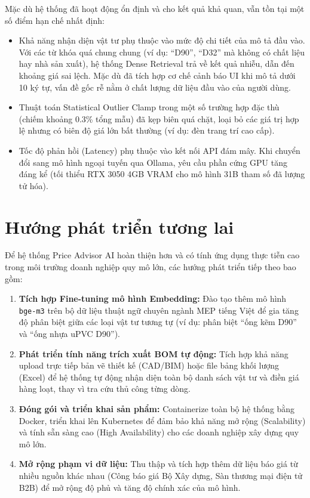Mặc dù hệ thống đã hoạt động ổn định và cho kết quả khả quan, vẫn tồn tại một số điểm hạn chế nhất định:

\begin{itemize}
    \item Khả năng nhận diện vật tư phụ thuộc vào mức độ chi tiết của mô tả đầu vào. Với các từ khóa quá chung chung (ví dụ: ``D90'', ``D32'' mà không có chất liệu hay nhà sản xuất), hệ thống Dense Retrieval trả về kết quả nhiễu, dẫn đến khoảng giá sai lệch. Mặc dù đã tích hợp cơ chế cảnh báo UI khi mô tả dưới 10 ký tự, vấn đề gốc rễ nằm ở chất lượng dữ liệu đầu vào của người dùng.

    \item Thuật toán Statistical Outlier Clamp trong một số trường hợp đặc thù (chiếm khoảng 0.3\% tổng mẫu) đã kẹp biên quá chặt, loại bỏ các giá trị hợp lệ nhưng có biên độ giá lớn bất thường (ví dụ: đèn trang trí cao cấp).

    \item Tốc độ phản hồi (Latency) phụ thuộc vào kết nối API đám mây. Khi chuyển đổi sang mô hình ngoại tuyến qua Ollama, yêu cầu phần cứng GPU tăng đáng kể (tối thiểu RTX 3050 4GB VRAM cho mô hình 31B tham số đã lượng tử hóa).
\end{itemize}

\section*{Hướng phát triển tương lai}

Để hệ thống Price Advisor AI hoàn thiện hơn và có tính ứng dụng thực tiễn cao trong môi trường doanh nghiệp quy mô lớn, các hướng phát triển tiếp theo bao gồm:

\begin{enumerate}
    \item \textbf{Tích hợp Fine-tuning mô hình Embedding:} Đào tạo thêm mô hình \texttt{bge-m3} trên bộ dữ liệu thuật ngữ chuyên ngành MEP tiếng Việt để gia tăng độ phân biệt giữa các loại vật tư tương tự (ví dụ: phân biệt ``ống kẽm D90'' và ``ống nhựa uPVC D90'').

    \item \textbf{Phát triển tính năng trích xuất BOM tự động:} Tích hợp khả năng upload trực tiếp bản vẽ thiết kế (CAD/BIM) hoặc file bảng khối lượng (Excel) để hệ thống tự động nhận diện toàn bộ danh sách vật tư và điền giá hàng loạt, thay vì tra cứu thủ công từng dòng.

    \item \textbf{Đóng gói và triển khai sản phẩm:} Containerize toàn bộ hệ thống bằng Docker, triển khai lên Kubernetes để đảm bảo khả năng mở rộng (Scalability) và tính sẵn sàng cao (High Availability) cho các doanh nghiệp xây dựng quy mô lớn.

    \item \textbf{Mở rộng phạm vi dữ liệu:} Thu thập và tích hợp thêm dữ liệu báo giá từ nhiều nguồn khác nhau (Công báo giá Bộ Xây dựng, Sàn thương mại điện tử B2B) để mở rộng độ phủ và tăng độ chính xác của mô hình.
\end{enumerate}
